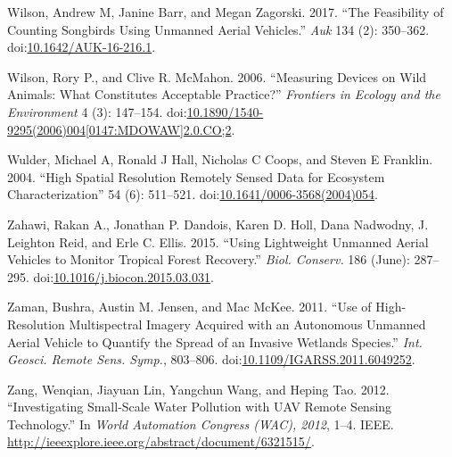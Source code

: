 \documentclass[]{interact}
\theoremstyle{plain}%
\theoremstyle{definition}
\theoremstyle{remark}
\begin{document}
\hypertarget{ref-wilson_feasibility_2017}{}
Wilson, Andrew M, Janine Barr, and Megan Zagorski. 2017. ``The
Feasibility of Counting Songbirds Using Unmanned Aerial Vehicles.''
\emph{Auk} 134 (2): 350--362.
doi:\href{https://doi.org/10.1642/AUK-16-216.1}{10.1642/AUK-16-216.1}.

\hypertarget{ref-wilson_measuring_2006}{}
Wilson, Rory P., and Clive R. McMahon. 2006. ``Measuring Devices on Wild
Animals: What Constitutes Acceptable Practice?'' \emph{Frontiers in
Ecology and the Environment} 4 (3): 147--154.
doi:\href{https://doi.org/10.1890/1540-9295(2006)004\%5B0147:MDOWAW\%5D2.0.CO;2}{10.1890/1540-9295(2006)004{[}0147:MDOWAW{]}2.0.CO;2}.

\hypertarget{ref-wulder_high_2004}{}
Wulder, Michael A, Ronald J Hall, Nicholas C Coops, and Steven E
Franklin. 2004. ``High Spatial Resolution Remotely Sensed Data for
Ecosystem Characterization'' 54 (6): 511--521.
doi:\href{https://doi.org/10.1641/0006-3568(2004)054}{10.1641/0006-3568(2004)054}.

\hypertarget{ref-zahawi_using_2015}{}
Zahawi, Rakan A., Jonathan P. Dandois, Karen D. Holl, Dana Nadwodny, J.
Leighton Reid, and Erle C. Ellis. 2015. ``Using Lightweight Unmanned
Aerial Vehicles to Monitor Tropical Forest Recovery.'' \emph{Biol.
Conserv.} 186 (June): 287--295.
doi:\href{https://doi.org/10.1016/j.biocon.2015.03.031}{10.1016/j.biocon.2015.03.031}.

\hypertarget{ref-zaman_use_2011}{}
Zaman, Bushra, Austin M. Jensen, and Mac McKee. 2011. ``Use of
High-Resolution Multispectral Imagery Acquired with an Autonomous
Unmanned Aerial Vehicle to Quantify the Spread of an Invasive Wetlands
Species.'' \emph{Int. Geosci. Remote Sens. Symp.}, 803--806.
doi:\href{https://doi.org/10.1109/IGARSS.2011.6049252}{10.1109/IGARSS.2011.6049252}.

\hypertarget{ref-zang_investigating_2012}{}
Zang, Wenqian, Jiayuan Lin, Yangchun Wang, and Heping Tao. 2012.
``Investigating Small-Scale Water Pollution with UAV Remote Sensing
Technology.'' In \emph{World Automation Congress (WAC), 2012}, 1--4.
IEEE. \url{http://ieeexplore.ieee.org/abstract/document/6321515/}.

\newpage
\singlespacing 
\end{document}
